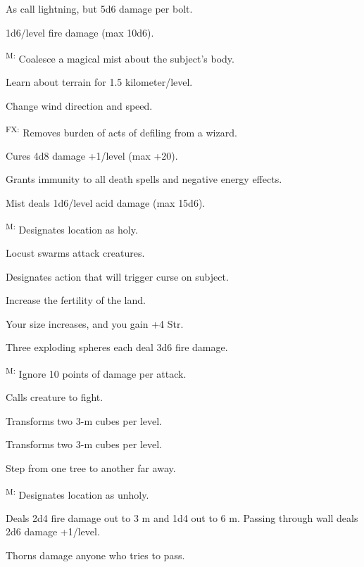  As call lightning, but 5d6 damage per bolt.

 1d6/level fire damage (max 10d6).

\textsuperscript{M:} Coalesce a magical mist about the subject's body.

 Learn about terrain for 1.5 kilometer/level.

 Change wind direction and speed.

\textsuperscript{FX:} Removes burden of acts of defiling from a wizard.

 Cures 4d8 damage +1/level (max +20).

 Grants immunity to all death spells and negative energy effects.

 Mist deals 1d6/level acid damage (max 15d6).

\textsuperscript{M:} Designates location as holy.

 Locust swarms attack creatures.

 Designates action that will trigger curse on subject.

 Increase the fertility of the land.

 Your size increases, and you gain +4 Str.

 Three exploding spheres each deal 3d6 fire damage.

\textsuperscript{M:} Ignore 10 points of damage per attack.

 Calls creature to fight.

 Transforms two 3-m cubes per level.

 Transforms two 3-m cubes per level.

 Step from one tree to another far away.

\textsuperscript{M:} Designates location as unholy.

 Deals 2d4 fire damage out to 3 m and 1d4 out to 6 m. Passing through wall deals 2d6 damage +1/level.

 Thorns damage anyone who tries to pass.



